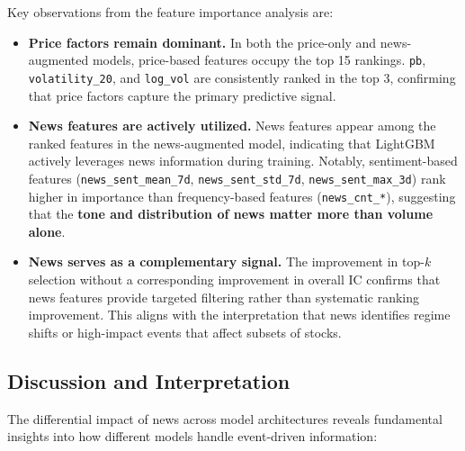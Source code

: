 Key observations from the feature importance analysis are:

\begin{itemize}
\item \textbf{Price factors remain dominant.} In both the price-only and news-augmented models, price-based features occupy the top 15 rankings. \texttt{pb}, \texttt{volatility\_20}, and \texttt{log\_vol} are consistently ranked in the top 3, confirming that price factors capture the primary predictive signal.

\item \textbf{News features are actively utilized.} News features appear among the ranked features in the news-augmented model, indicating that LightGBM actively leverages news information during training. Notably, sentiment-based features (\texttt{news\_sent\_mean\_7d}, \texttt{news\_sent\_std\_7d}, \texttt{news\_sent\_max\_3d}) rank higher in importance than frequency-based features (\texttt{news\_cnt\_*}), suggesting that the \textbf{tone and distribution of news matter more than volume alone}.

\item \textbf{News serves as a complementary signal.} The improvement in top-$k$ selection without a corresponding improvement in overall IC confirms that news features provide targeted filtering rather than systematic ranking improvement. This aligns with the interpretation that news identifies regime shifts or high-impact events that affect subsets of stocks.

\end{itemize}

\subsection{Discussion and Interpretation}

The differential impact of news across model architectures reveals fundamental insights into how different models handle event-driven information:

